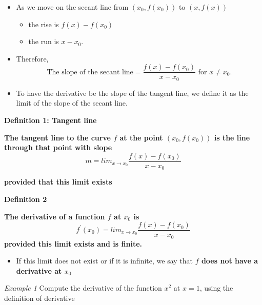 \documentclass[]{book}
\providecommand{\tightlist}{%
  \setlength{\itemsep}{0pt}\setlength{\parskip}{0pt}}
\begin{document}
\begin{itemize}
\tightlist
\item
  As we move on the secant line from \((x_0, f{(x_0)})\) to \((x, f{(x)})\)

  \begin{itemize}
  \tightlist
  \item
    the rise is \(f(x) - f(x_0)\)
  \item
    the run is \(x - x_0\).
  \end{itemize}
\item
  Therefore,
  \[\text{The slope of the secant line} = \frac{f(x) - f(x_0)}{x - x_0} \text{ for } x\neq x_0.\]
\item
  To have the derivative be the slope of the tangent line, we define it as the limit of the slope of the secant line.
\end{itemize}

\textbf{Definition 1: Tangent line }

\textbf{The tangent line to the curve \(f\) at the point \((x_0, f(x_0))\) is the line through that point with slope} \[m = lim_{x\to x_{0}}\frac{f(x)-f(x_0)}{x-x_0}\]

\textbf{provided that this limit exists}

\textbf{Definition 2}

\textbf{The derivative of a function \(f\) at \(x_0\) is}
\[f^{\prime}(x_0) = lim_{x\to x_{0}}\frac{f(x) - f(x_0)}{x-x_0}\]
\textbf{provided this limit exists and is finite.}

\begin{itemize}
\tightlist
\item
  If this limit does not exist or if it is infinite, we say that \textbf{\(f\) does not have a derivative at \(x_{0}\)}
\end{itemize}

\newpage

\emph{Example 1}
Compute the derivative of the function \(x^2\) at \(x=1\), using the definition of derivative
\end{document}
